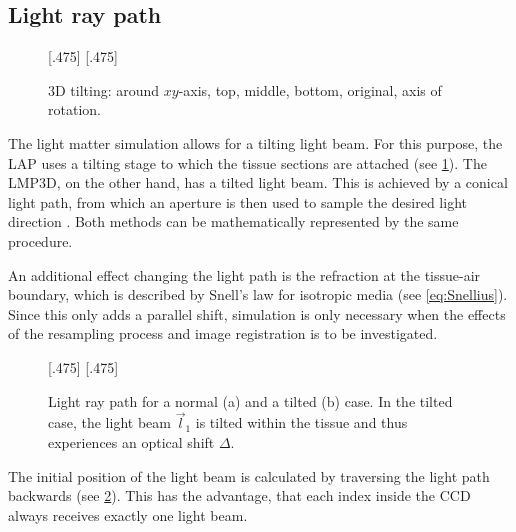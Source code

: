 \subsection{Light ray path}
\label{sec:pathOfLight}
%
\begin{figure}[!t]
\setlength{\tikzheight}{0.42\textwidth}
[.475\textwidth]{}\hfill
{}
[.475\textwidth]{}
\tikzset{external/export=false}
\caption[3D tilting]{3D tilting: around $xy$-axis, \raisebox{.25em}{\tikz \draw[red,thick](0,0)--(0.25,0);} top, \raisebox{.25em}{\tikz \draw[green,thick](0,0)--(0.25,0);} middle, \raisebox{.25em}{\tikz \draw[blue,thick](0,0)--(0.25,0);} bottom, \raisebox{.25em}{\tikz \draw[dash pattern=on 1.25pt off 1.25pt,thick](0,0)--(0.25,0);} original, \raisebox{.25em}{\tikz \draw[gray](0,0)--(0.25,0);} axis of rotation.}
\label{fig:tilting_camera_view}
\end{figure}
%
The light matter simulation allows for a tilting light beam.
For this purpose, the \ac{LAP} uses a tilting stage to which the tissue sections are attached (see \cref{fig:tilting_camera_view}).
The \ac{LMP3D}, on the other hand, has a tilted light beam.
This is achieved by a conical light path, from which an aperture is then used to sample the desired light direction \cite{Wiese:887678}.
Both methods can be mathematically represented by the same procedure.
\par
%
An additional effect changing the light path is the refraction at the tissue-air boundary, which is described by Snell's law for isotropic media (see \cref{eq:Snellius}).
Since this only adds a parallel shift, simulation is only necessary when the effects of the resampling process and image registration is to be investigated.
\par
%
\begin{figure}[!t]
\setlength{\tikzwidth}{0.45\textwidth}
[.475\textwidth]{
\def\tilt{0}
\def\nindex{2.25}
}\hfill
{}[.475\textwidth]{
}
\caption[Light path]{Light ray path for a normal (a) and a tilted (b) case. In the tilted case, the light beam $\vec{l}_1$ is tilted within the tissue and thus experiences an optical shift $\Delta$.}
\label{fig:tilted_side_view}
\end{figure}
%
The initial position of the light beam is calculated by traversing the light path backwards (see \cref{fig:tilted_side_view}).
This has the advantage, that each index inside the \ac{CCD} always receives exactly one light beam.

